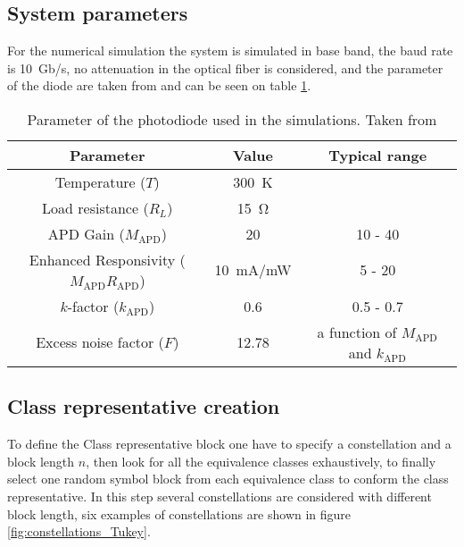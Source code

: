 \subsection{System parameters}

For the numerical simulation the system is simulated in base band, the baud rate is \SI{10}{Gb/s}, no attenuation in the optical fiber is considered, and the parameter of the diode are taken from \cite{Tasbihi_Tukey} and can be seen on table \ref{tab:diode_Tukey}.\\

\begin{table}[htp]
\begin{center}
\begin{tabular}{|c|c|c|}\hline
Parameter&Value&Typical range\\\hline
Temperature ($T$)&\SI{300}{K}&\\\hline
Load resistance ($R_L$)&\SI{15}{\ohm}&\\\hline
APD Gain ($M_\text{APD}$)&20&10 - 40\\\hline
Enhanced Responsivity ($M_\text{APD}R_\text{APD}$)& \SI{10}{\mA/\mW}& 5 - 20\\\hline
$k$-factor ($k_\text{APD}$)&0.6&0.5 - 0.7\\\hline
Excess noise factor ($F$)&12.78&a function of $M_\text{APD}$ and $k_\text{APD}$\\\hline
\end{tabular}
\end{center}
\caption{Parameter of the photodiode used in the simulations. Taken from \cite{Tasbihi_Tukey}}
\label{tab:diode_Tukey}
\end{table}%

\subsection{Class representative creation}

To define the Class representative block one have to specify a constellation and a block length $n$, then look for all the equivalence classes exhaustively, to finally select one random symbol block from each equivalence class to conform the class representative. In this step several constellations are considered with different block length, six examples of constellations are shown in figure \ref{fig:constellations_Tukey}.\\

